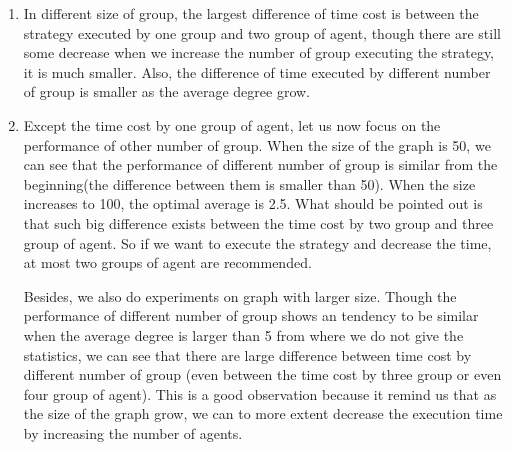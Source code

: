 \begin{enumerate}
\item In different size of group, the largest difference of time cost is between the strategy executed by one group and two group of agent, though there are still some decrease when we increase the number of group executing the strategy, it is much smaller. Also, the difference of time executed by different number of group is smaller as the average degree grow.

\item Except the time cost by one group of agent, let us now focus on the performance of other number of group. When the size of the graph is 50, we can see that the performance of different number of group is similar from the beginning(the difference between them is smaller than 50). When the size increases to 100, the optimal average is  2.5. What should be pointed out is that such big difference exists between the time cost by two group and three group of agent. So if we want to execute the strategy and decrease the time, at most two groups of agent are recommended. 

Besides, we also do experiments on graph with larger size. Though the performance of different number of group shows an tendency to be similar when the average degree is larger than 5 from where we do not give the statistics, we can see that there are large difference between time cost by different number of group (even between the time cost  by three group or even four group of agent). This is a good observation because it remind us that as the size of the graph grow, we can to more extent decrease the execution time by increasing the number of agents.
\end{enumerate}


   


  









































 